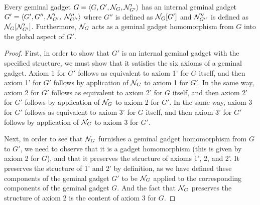 \documentclass[./main.tex]{subfiles}
\begin{document}
\begin{theorem}\label{GLContainsGL}
Every geminal gadget $G = \langle G, G', \mathcal{N}_{G}, \mathcal{N}'_{G'}\rangle$ has an internal geminal gadget $G' = \langle G', G'', \mathcal{N}'_{G'},$ $\mathcal{N}''_{G''}\rangle$ where $G''$ is defined as $\mathcal{N}_{G}[G']$ and $\mathcal{N}''_{G''}$ is defined as $\mathcal{N}_{G}[\mathcal{N}'_{G'}]$. Furthermore, $\mathcal{N}_{G}$ acts as a geminal gadget homomorphism from $G$ into the global aspect of $G'$.
\end{theorem}
\begin{proof}
First, in order to show that $G'$ is an internal geminal gadget with the specified structure, we must show that it satisfies the six axioms of a geminal gadget. Axiom 1 for $G'$ follows as equivalent to axiom 1' for $G$ itself, and then axiom 1' for $G'$ follows by application of $\mathcal{N}_{G}$ to axiom 1 for $G'$. In the same way, axiom 2 for $G'$ follows as equivalent to axiom 2' for $G$ itself, and then axiom 2' for $G'$ follows by application of $\mathcal{N}_{G}$ to axiom 2 for $G'$. In the same way, axiom 3 for $G'$ follows as equivalent to axiom 3' for $G$ itself, and then axiom 3' for $G'$ follows by application of $\mathcal{N}_{G}$ to axiom 3 for $G'$.

Next, in order to see that $\mathcal{N}_{G}$ furnishes a geminal gadget homomorphism from $G$ to $G'$, we need to observe that it is a gadget homomorphism (this is given by axiom 2 for $G$), and that it preserves the structure of axioms 1', 2, and 2'. It preserves the structure of 1' and 2' by definition, as we have defined these components of the geminal gadget $G'$ to be $\mathcal{N}_{G}$ applied to the corresponding components of the geminal gadget $G$. And the fact that $\mathcal{N}_{G}$ preserves the structure of axiom 2 is the content of axiom 3 for $G$.
\end{proof}
\end{document}
